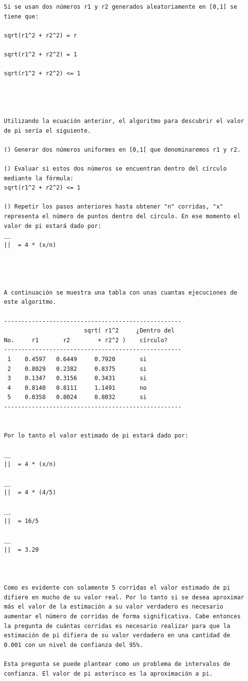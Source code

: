 \begin{verbatim}
Si se usan dos números r1 y r2 generados aleatoriamente en [0,1[ se tiene que:

sqrt(r1^2 + r2^2) = r

sqrt(r1^2 + r2^2) = 1

sqrt(r1^2 + r2^2) <= 1




Utilizando la ecuación anterior, el algoritmo para descubrir el valor de pi sería el siguiente.

() Generar dos números uniformes en [0,1[ que denominaremos r1 y r2.

() Evaluar si estos dos números se encuentran dentro del círculo mediante la fórmula: 
sqrt(r1^2 + r2^2) <= 1

() Repetir los pasos anteriores hasta obtener "n" corridas, "x" representa el número de puntos dentro del círculo. En ese momento el valor de pi estará dado por:
__
||  = 4 * (x/n)




A continuación se muestra una tabla con unas cuantas ejecuciones de este algoritmo.

---------------------------------------------------
                       sqrt( r1^2     ¿Dentro del
No.     r1       r2        + r2^2 )    círculo? 
---------------------------------------------------
 1    0.4597   0.6449     0.7920       si
 2    0.8029   0.2382     0.8375       si
 3    0.1347   0.3156     0.3431       si
 4    0.8140   0.8111     1.1491       no
 5    0.0358   0.8024     0.8032       si
---------------------------------------------------


Por lo tanto el valor estimado de pi estará dado por:

__
||  = 4 * (x/n)

__
||  = 4 * (4/5)

__
||  = 16/5

__
||  = 3.20



Como es evidente con solamente 5 corridas el valor estimado de pi difiere en mucho de su valor real. Por lo tanto si se desea aproximar más el valor de la estimación a su valor verdadero es necesario aumentar el número de corridas de forma significativa. Cabe entonces la pregunta de cuántas corridas es necesario realizar para que la estimación de pi difiera de su valor verdadero en una cantidad de 0.001 con un nivel de confianza del 95%. 

Esta pregunta se puede plantear como un problema de intervalos de confianza. El valor de pi asterisco es la aproximación a pi.



\end{verbatim}
